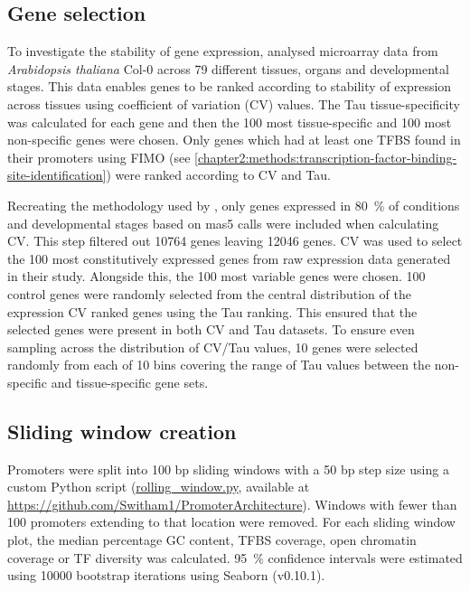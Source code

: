 \documentclass[../main.tex]{subfiles}
\begin{document}
\subsection{Gene selection}\label{chapter2:methods:gene-selection}

To investigate the stability of gene expression, \textcite*{czechowskiGenomeWideIdentificationTesting2005} analysed microarray data from \textit{Arabidopsis thaliana} Col-0 across 79 different tissues, organs and developmental stages.
This data enables genes to be ranked according to stability of expression across tissues using coefficient of variation (CV) values.
The Tau tissue\hyp{}specificity \autocite{yanaiGenomewideMidrangeTranscription2005} was calculated for each gene and then the 100 most tissue\hyp{}specific and 100 most non\hyp{}specific genes were chosen.
Only genes which had at least one TFBS found in their promoters using FIMO (see \autoref{chapter2:methods:transcription-factor-binding-site-identification}) were ranked according to CV and Tau.

Recreating the methodology used by \textcite*{czechowskiGenomeWideIdentificationTesting2005}, only genes expressed in \SI{80}{\percent} of conditions and developmental stages based on mas5 calls were included when calculating CV.
This step filtered out 10764 genes leaving 12046 genes.
CV was used to select the 100 most constitutively expressed genes from raw expression data generated in their study.
Alongside this, the 100 most variable genes were chosen.
100 control genes were randomly selected from the central distribution of the expression CV ranked genes using the Tau ranking.
This ensured that the selected genes were present in both CV and Tau datasets.
To ensure even sampling across the distribution of CV/Tau values, 10 genes were selected randomly from each of 10 bins covering the range of Tau values between the non\hyp{}specific and tissue\hyp{}specific gene sets.


\subsection{Sliding window creation}\label{chapter2:methods:sliding-window-creation}

Promoters were split into 100 bp sliding windows with a 50 bp step size using a custom Python script (\href{https://github.com/Switham1/PromoterArchitecture/blob/master/src/rolling_window/rolling_window.py}{rolling\_window.py}, available at \url{https://github.com/Switham1/PromoterArchitecture}).
Windows with fewer than 100 promoters extending to that location were removed.
For each sliding window plot, the median percentage GC content, TFBS coverage, open chromatin coverage or TF diversity was calculated. \SI{95}{\percent} confidence intervals were estimated using 10000 bootstrap iterations using Seaborn (v0.10.1).
\end{document}

